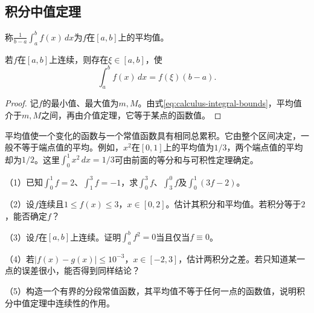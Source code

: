 \subsection{积分中值定理}

\begin{definition}
称\(\displaystyle\frac1{b-a}\int_a^b f(x)\,dx\)为\(f\)在\([a,b]\)上的{\heiti{}平均值}。
\end{definition}

\begin{theorem}[积分中值定理]\label{thm:calculus-integral-mean-value}
若\(f\)在\([a,b]\)上连续，则存在\(\xi\in[a,b]\)，使
\begin{equation*}
 \int_a^b f(x)\,dx=f(\xi)(b-a).
\end{equation*}
\end{theorem}

\begin{proof}
记\(f\)的最小值、最大值为\(m,M\)。由式\eqref{eq:calculus-integral-bounds}，平均值介于\(m,M\)之间，再由介值定理，它等于某点的函数值。
\end{proof}

平均值使一个变化的函数与一个常值函数具有相同总累积。它由整个区间决定，一般不等于端点值的平均。例如，\(x^2\)在\([0,1]\)上的平均值为\(1/3\)，两个端点值的平均却为\(1/2\)。这里\(\int_0^1x^2\,dx=1/3\)可由前面的等分和与可积性定理确定。

\begin{exercise}
\mbox{}\par\nobreak

（1）已知\(\int_0^1f=2\)、\(\int_1^3f=-1\)，求\(\int_0^3f\)、\(\int_3^0f\)及\(\int_0^1(3f-2)\)。

（2）设\(f\)连续且\(1\le f(x)\le3\)，\(x\in[0,2]\)。估计其积分和平均值。若积分等于\(2\)，能否确定\(f\)？

（3）设\(f\)在\([a,b]\)上连续。证明\(\int_a^b f^2=0\)当且仅当\(f\equiv0\)。

（4）若\(|f(x)-g(x)|\le10^{-3}\)，\(x\in[-2,3]\)，估计两积分之差。若只知道某一点的误差很小，能否得到同样结论？

（5）构造一个有界的分段常值函数，其平均值不等于任何一点的函数值，说明积分中值定理中连续性的作用。
\end{exercise}
